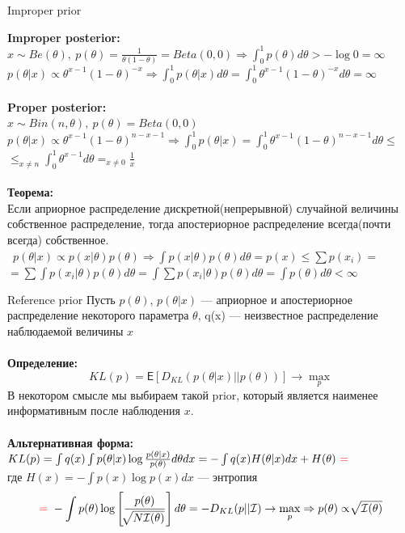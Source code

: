 \documentclass[10pt]{beamer}
\begin{document}
\begin{frame}{Improper prior}

{\bf Improper posterior:}\\
\quad
	$x \sim Be(\theta),~p(\theta) = \frac{1}{\theta(1-\theta)} = Beta(0,0) \Rightarrow \int_0^1 p(\theta)d\theta > -\log0 = \infty$\\
\quad
	$p(\theta|x) \propto \theta^{x - 1}(1-\theta)^{-x} \Rightarrow \int_0^1 p(\theta|x)d\theta = \int_0^1 \theta^{x-1}(1-\theta)^{-x}d\theta = \infty$\\
	~\\
{\bf Proper posterior:}\\
\quad
	$x \sim Bin(n, \theta),~ p(\theta) = Beta(0,0)$\\
\quad
	$p(\theta|x) \propto \theta^{x-1}(1-\theta)^{n-x-1} \Rightarrow \int_0^{1}p(\theta|x)=\int_0^1 \theta^{x-1}(1-\theta)^{n-x-1}d\theta \leq$\\
	$\leq_{x\not=n} \int_0^1\theta^{x-1}d\theta =_{x\not=0} \frac{1}{x}$\\
	~\\
{\bf Теорема:}\\
\quad
	Если априорное распределение дискретной(непрерывной) случайной величины собственное распределение, тогда апостериорное распределение всегда(почти всегда) собственное.\\
	 $p(\theta|x) \propto p(x|\theta)p(\theta) \Rightarrow \int p(x|\theta)p(\theta)d\theta = p(x) \leq \sum p(x_i) = $\\
	$=\sum\int p(x_i|\theta)p(\theta)d\theta = \int\sum p(x_i|\theta)p(\theta)d\theta = \int p(\theta)d\theta < \infty$
	~\\
\end{frame}
\begin{frame}{Reference prior}
Пусть $p(\theta)$, $p(\theta|x)$ --- априорное и апостериорное распределение некоторого параметра $\theta$, q(x) --- неизвестное распределение наблюдаемой величины $x$\\
~\\
{\bf Определение:}\\
\quad
	$$KL(p) = \mathsf{E}\left[D_{KL}\left(p\left(\theta|x\right)||p\left(\theta\right)\right)\right] \to \max_{p}$$
\quad
	 В некотором смысле мы выбираем такой prior, который является наименее информативным после наблюдения $x$.\\
	~\\
{\bf Альтернативная форма:}\\
\quad
	$KL(p)=\int q(x)\int p(\theta|x)\log\frac{p(\theta|x)}{p(\theta)}d\theta dx = -\int q(x)H(\theta|x)dx + H(\theta)~\textcolor[rgb]{1,0,0}{=}$\\
где $H(x) = -\int p(x)\log p(x)dx$ --- энтропия\\
\quad
	$$\textcolor[rgb]{1,0,0}{=}~-\int p(\theta)\log\left[\frac{p(\theta)}{\sqrt[]{N\mathcal{I}(\theta)}}\right]d\theta = - D_{KL}(p||\mathcal{I}) \to \max_{p} \Rightarrow p(\theta) \propto \sqrt[]{\mathcal{I}(\theta)}$$
	~\\

\end{frame}
\end{document}
